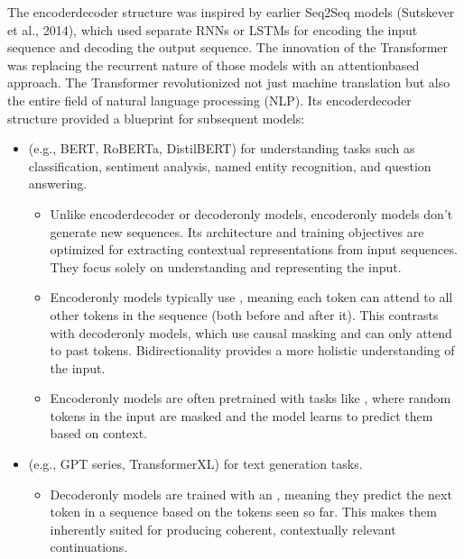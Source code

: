 \documentclass[letterpaper,11pt,english]{sphinxmanual}
\begin{document}
\sphinxAtStartPar
The encoder\sphinxhyphen{}decoder structure was inspired by earlier Seq2Seq models
(Sutskever et al., 2014), which used separate RNNs or LSTMs for encoding
the input sequence and decoding the output sequence. The innovation of
the Transformer was replacing the recurrent nature of those models with
an attention\sphinxhyphen{}based approach. The Transformer revolutionized not just
machine translation but also the entire field of natural language
processing (NLP). Its encoder\sphinxhyphen{}decoder structure provided a blueprint for
subsequent models:
\begin{itemize}
\item {} 
\sphinxAtStartPar
{} (e.g., BERT, RoBERTa, DistilBERT) for
understanding tasks such as classification, sentiment analysis, named
entity recognition, and question answering.
\begin{itemize}
\item {} 
\sphinxAtStartPar
Unlike encoder\sphinxhyphen{}decoder or decoder\sphinxhyphen{}only models, encoder\sphinxhyphen{}only models
don’t generate new sequences. Its architecture and training
objectives are optimized for extracting contextual representations
from input sequences. They focus solely on understanding and
representing the input.

\item {} 
\sphinxAtStartPar
Encoder\sphinxhyphen{}only models typically use ,
meaning each token can attend to all other tokens in the sequence
(both before and after it). This contrasts with decoder\sphinxhyphen{}only models,
which use causal masking and can only attend to past tokens.
Bidirectionality provides a more holistic understanding of the
input.

\item {} 
\sphinxAtStartPar
Encoder\sphinxhyphen{}only models are often pretrained with tasks like , where random tokens in the input are
masked and the model learns to predict them based on context.

\end{itemize}

\item {} 
\sphinxAtStartPar
{} (e.g., GPT series, Transformer\sphinxhyphen{}XL) for text
generation tasks.
\begin{itemize}
\item {} 
\sphinxAtStartPar
Decoder\sphinxhyphen{}only models are trained with an , meaning they predict the next token in a sequence based
on the tokens seen so far. This makes them inherently suited for
producing coherent, contextually relevant continuations.


\end{itemize}
\end{itemize}
\end{document}
